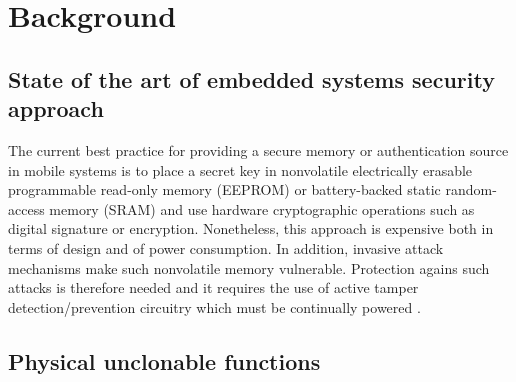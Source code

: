 \chapter{Background}

\section{State of the art of embedded systems security approach}

The current best practice for providing a secure memory or authentication source in mobile systems is to place a secret key in nonvolatile electrically erasable programmable read-only memory (EEPROM) or battery-backed static random-access memory (SRAM) and use hardware cryptographic operations such as digital signature or encryption. Nonetheless, this approach is expensive both in terms of design and of power consumption. In addition, invasive attack mechanisms make such nonvolatile memory vulnerable. Protection agains such attacks is therefore needed and it requires the use of active tamper detection/prevention circuitry which must be continually powered \cite{PUF_IEEE_Herder}.

\section{Physical unclonable functions}\label{section:physicalUnclonableFunctions}

